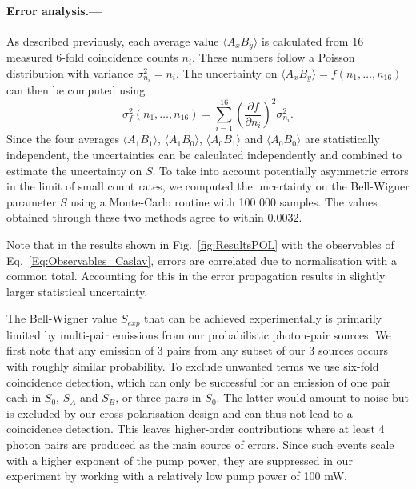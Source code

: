 \documentclass[aps,floatfix,superscriptaddress,twocolumn,tightenlines,amsmath,amssymb,nofootinbib,10pt]{revtex4-1}
\begin{document}
\bigskip

\paragraph*{Error analysis.--- }
As described previously, each average value $\langle A_{x}B_{y} \rangle$ is calculated from 16 measured 6-fold coincidence counts $n_i$. These numbers follow a Poisson distribution with variance $\sigma_{n_i}^2 = n_i$. The uncertainty on $\langle A_{x}B_{y} \rangle = f(n_1,\ldots,n_{16})$ can then be computed using
\begin{equation}
\sigma^{2}_{f}(n_{1},\ldots,n_{16})=\sum_{i=1}^{16}\left(\frac{\partial f}{\partial n_{i}}\right)^{2}\sigma_{n_{i}}^{2}  .
\end{equation}
Since the four averages $\langle A_{1}B_{1} \rangle$, $\langle A_{1}B_{0} \rangle$, $\langle A_{0}B_{1} \rangle$ and $\langle A_{0}B_{0} \rangle$ are statistically independent, the uncertainties can be calculated independently and combined to estimate the uncertainty on $S$. To take into account potentially asymmetric errors in the limit of small count rates, we computed the uncertainty on the Bell-Wigner parameter $S$ using a Monte-Carlo routine with {100 000} samples. The values obtained through these two methods agree to within $0.0032$.

Note that in the results shown in Fig.~\ref{fig:ResultsPOL} with the observables of Eq.~\eqref{Eq:Observables_Caslav}, errors are correlated due to normalisation with a common total. Accounting for this in the error propagation results in slightly larger statistical uncertainty.

The Bell-Wigner value $S_{exp}$ that can be achieved experimentally is primarily limited by multi-pair emissions from our probabilistic photon-pair sources. We first note that any emission of 3 pairs from any subset of our 3 sources occurs with roughly similar probability. To exclude unwanted terms we use six-fold coincidence detection, which can only be successful for an emission of one pair each in $S_0$, $S_A$ and $S_B$, or three pairs in $S_0$. The latter would amount to noise but is excluded by our cross-polarisation design and can thus not lead to a coincidence detection. This leaves higher-order contributions where at least 4 photon pairs are produced as the main source of errors. Since such events scale with a higher exponent of the pump power, they are suppressed in our experiment by working with a relatively low pump power of 100 mW.
\end{document}
